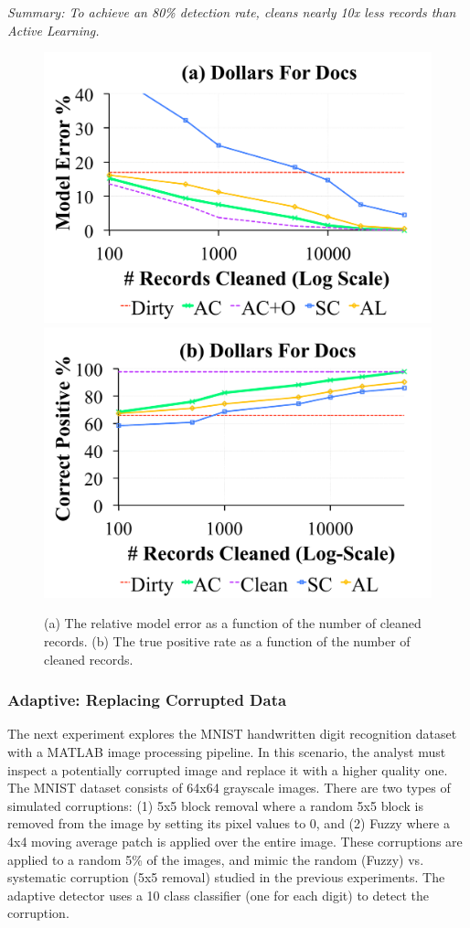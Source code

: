 \noindent \emph{Summary: To achieve an 80\% detection rate, \sys cleans nearly 10x less records than Active Learning. }

\begin{figure}[t]
\centering\vspace{-1em}
 \includegraphics[width=0.49\columnwidth]{exp/exp13a.pdf}
 \includegraphics[width=0.49\columnwidth]{exp/exp13b.pdf}\vspace{-1em}
 \caption{(a) The relative model error as a function of the number of cleaned records. (b) The true positive rate as a function of the number of cleaned records. \label{dfd}}
\end{figure}

\subsubsection{Adaptive: Replacing Corrupted Data}
The next experiment explores the MNIST handwritten digit recognition dataset with a MATLAB image processing pipeline.
In this scenario, the analyst must inspect a potentially corrupted image and replace it with a higher quality one.
The MNIST dataset consists of 64x64 grayscale images.
There are two types of simulated corruptions: (1) 5x5 block removal where a random 5x5 block is removed from the image by setting its pixel values to 0, and (2) Fuzzy where a 4x4 moving average patch is applied over the entire image.
These corruptions are applied to a random 5\% of the images, and mimic the random (Fuzzy) vs. systematic corruption (5x5 removal) studied in the previous experiments.
The adaptive detector uses a 10 class classifier (one for each digit) to detect the corruption.

